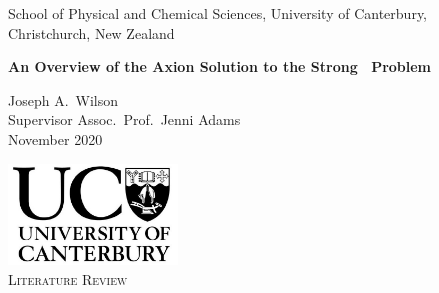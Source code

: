 
\begin{titlepage}


\begin{center} \linespread{0.9}
\Large School of Physical and Chemical Sciences, University of Canterbury, Christchurch, New Zealand
\end{center}

\vspace{3cm}

\begin{center}
\huge\bf
An Overview of the Axion Solution to the Strong \CP\ Problem
\end{center}


\begin{center} \linespread{1.5}
	\Large
	Joseph A.\ Wilson
\\	Supervisor Assoc.\ Prof.\ Jenni Adams
\\	November 2020
\end{center}

\iftrue
\vspace{3cm}
\centerline{}
\fi

\vfill

\begin{center} \linespread{1.5}
\includegraphics[width=45mm]{resources/UC.png} \\
\vspace{1ex}
\Large \textsc{Literature Review} \\
\end{center}
\vspace{4pt}

\vspace{2cm}

\end{titlepage}

\restoregeometry
